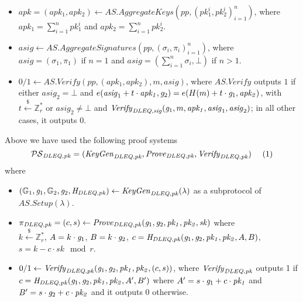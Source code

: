 \begin{construction}
\begin{itemize}
\item $\mathit{apk} = (\mathit{apk_1}, \mathit{apk_2}) \leftarrow \mathit{AS.AggregateKeys}(\mathit{pp}, (\mathit{pk_1^i}, \mathit{pk_2^i})_{i=1}^{n})$, 
where  $\mathit{apk_1} = \sum_{i=1}^{n} \mathit{pk_1^i}$ and $\mathit{apk_2} = \sum_{i=1}^{n} \mathit{pk_2^i}$. 
\item $\mathit{asig} \leftarrow \mathit{AS.AggregateSignatures}(\mathit{pp}, (\sigma_i, \pi_i)_{i=1}^n)$, 
where \\ $\mathit{asig} = (\sigma_1, \pi_1)$  if $n=1$ and $\mathit{asig} = (\sum_{i=1}^{n} \sigma_i, \bot)$ if $n>1$. 
\item $0/1 \leftarrow  \mathit{AS.Verify}(\mathit{pp}, (\mathit{apk_1}, \mathit{apk_2}), m, \mathit{asig})$, where $\mathit{AS.Verify}$ outputs $1$ if either 
$\mathit{asig}_2 = \bot$ and $e(\mathit{asig}_1 + t \cdot \mathit{apk_1}, \mathit{g}_{2}) = e(H(m) + t \cdot \mathit{g}_{1}, \mathit{apk_2})$, with $t \xleftarrow{\$} \mathbb{Z}_{r}^{*}$ 
or $\mathit{asig}_2 \neq \bot$ and $\mathit{Verify}_{\mathit{DLEQ}, \mathit{sig}}(\mathit{g}_{1}, m, \mathit{apk_1}, \mathit{asig}_1, \mathit{asig}_2)$; in all other cases, it outputs $0$. 
\end{itemize}
Above we have used the following proof systems 
$$ \PSpk = (\Genpk, \Provpk, \Veripk) \ \ \ \ (1)$$ 
where 
\begin{itemize}
\item $(\mathbb{G}_{1}, \mathit{g}_{1}, \mathbb{G}_{2}, \mathit{g}_{2}, \mathit{H}_{\mathit{DLEQ}, \mathit{pk}}) \leftarrow \mathit{KeyGen}_{\mathit{DLEQ}, \mathit{pk}}(\lambda)$ as a subprotocol of $\mathit{AS.Setup}(\lambda)$. 

\item $\pi_{\mathit{DLEQ}, \mathit{pk}} = (c,s) \leftarrow \mathit{Prove}_{\mathit{DLEQ}, \mathit{pk}}(\mathit{g}_{1}, \mathit{g}_{2}, \mathit{pk_1}, \mathit{pk_2}, \mathit{sk})$ where \\ $k \xleftarrow{\$} \mathbb{Z}_{r}^{*}$, $A =k \cdot \mathit{g}_{1}$, 
$B=k \cdot  \mathit{g}_{2}$, $c = \mathit{H}_{\mathit{DLEQ}, \mathit{pk}} (\mathit{g}_{1}, \mathit{g}_{2}, \mathit{pk_1}, \mathit{pk_2}, A, B)$, \\ $s = k - c \cdot \mathit{sk} \mod r$. 

\item $0/1 \leftarrow \mathit{Verify}_{\mathit{DLEQ}, \mathit{pk}}(\mathit{g}_{1}, \mathit{g}_{2}, \mathit{pk_1}, \mathit{pk_2}, (c,s))$, 
where $\mathit{Verify}_{\mathit{DLEQ}, \mathit{pk}}$ outputs 1 if  $c= \mathit{H}_{\mathit{DLEQ}, \mathit{pk}} (\mathit{g}_{1}, \mathit{g}_{2}, \mathit{pk_1}, \mathit{pk_2}, A', B')$
where $A' = s \cdot \mathit{g}_{1} + c \cdot \mathit{pk_1}$ and $B' = s \cdot \mathit{g}_{2}  + c \cdot \mathit{pk_2}$ and it outputs $0$ otherwise.  
\end{itemize}


\end{construction}
